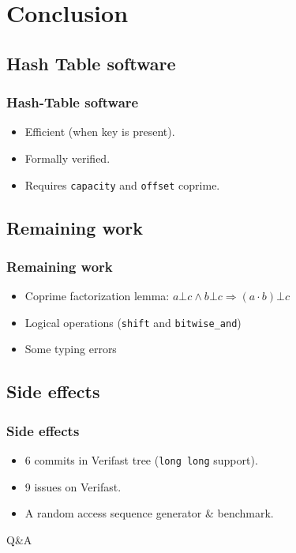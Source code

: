 \documentclass{beamer}
\begin{document}
\section{Conclusion}
\subsection{Hash Table software}
\begin{frame}
	\frametitle{Hash-Table software}
	\begin{itemize}
		\item Efficient (when key is present).
		\item Formally verified.
		\item Requires \texttt{capacity} and \texttt{offset} coprime.
	\end{itemize}
\end{frame}

\subsection{Remaining work}
\begin{frame}
	\frametitle{Remaining work}
	\begin{itemize}
		\item Coprime factorization lemma: $a\bot c \wedge b\bot c \Rightarrow (a\cdot b)\bot c$
		\item Logical operations (\texttt{shift} and \texttt{bitwise\_and})
		\item Some typing errors
	\end{itemize}
\end{frame}
\subsection{Side effects}
\begin{frame}
	\frametitle{Side effects}
	\begin{itemize}
		\item 6 commits in Verifast tree (\texttt{long long} support).
		\item 9 issues on Verifast.
		\item A random access sequence generator \& benchmark.
	\end{itemize}
\end{frame}



\begin{frame}
	\begin{center}
		\huge{Q\&A}
	\end{center}
\end{frame}
\end{document}
